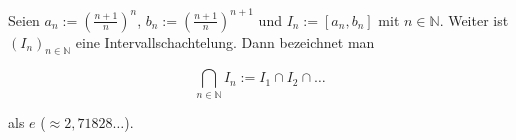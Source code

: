 Seien $a_n := (\frac{n+1}{n})^n$, $b_n := (\frac{n+1}{n})^{n+1}$ und $I_n := [a_n, b_n]$ mit $n \in \mathbb{N}$. Weiter ist $(I_n)_{n \in \mathbb{N}}$ eine Intervallschachtelung. Dann bezeichnet man

$$\bigcap_{n \in \mathbb{N}} I_n := I_1 \cap I_2 \cap \dots$$

als  $e$ ($\approx 2,71828 \dots$).